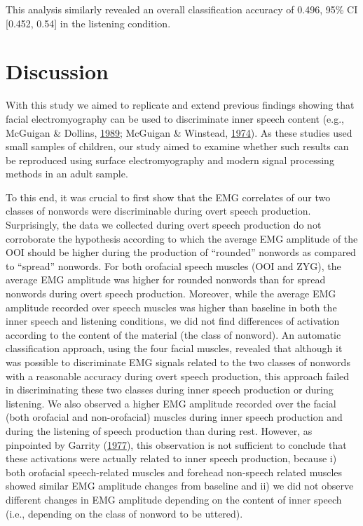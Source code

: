 \documentclass[a4paper,12pt,twoside,onecolumn,openright,final,oldfontcommands]{memoir}
\begin{document}
This analysis similarly revealed an overall classification accuracy of 0.496, 95\% CI {[}0.452, 0.54{]} in the listening condition.

\hypertarget{discussion-2}{%
\section{Discussion}\label{discussion-2}}

With this study we aimed to replicate and extend previous findings showing that facial electromyography can be used to discriminate inner speech content (e.g., McGuigan \& Dollins, \protect\hyperlink{ref-mcguigan_patterns_1989}{1989}; McGuigan \& Winstead, \protect\hyperlink{ref-mcguigan_discriminative_1974}{1974}). As these studies used small samples of children, our study aimed to examine whether such results can be reproduced using surface electromyography and modern signal processing methods in an adult sample.

To this end, it was crucial to first show that the EMG correlates of our two classes of nonwords were discriminable during overt speech production. Surprisingly, the data we collected during overt speech production do not corroborate the hypothesis according to which the average EMG amplitude of the OOI should be higher during the production of \enquote{rounded} nonwords as compared to \enquote{spread} nonwords. For both orofacial speech muscles (OOI and ZYG), the average EMG amplitude was higher for rounded nonwords than for spread nonwords during overt speech production. Moreover, while the average EMG amplitude recorded over speech muscles was higher than baseline in both the inner speech and listening conditions, we did not find differences of activation according to the content of the material (the class of nonword). An automatic classification approach, using the four facial muscles, revealed that although it was possible to discriminate EMG signals related to the two classes of nonwords with a reasonable accuracy during overt speech production, this approach failed in discriminating these two classes during inner speech production or during listening. We also observed a higher EMG amplitude recorded over the facial (both orofacial and non-orofacial) muscles during inner speech production and during the listening of speech production than during rest. However, as pinpointed by Garrity (\protect\hyperlink{ref-garrity_electromyography_1977}{1977}), this observation is not sufficient to conclude that these activations were actually related to inner speech production, because i) both orofacial speech-related muscles and forehead non-speech related muscles showed similar EMG amplitude changes from baseline and ii) we did not observe different changes in EMG amplitude depending on the content of inner speech (i.e., depending on the class of nonword to be uttered).
\end{document}
